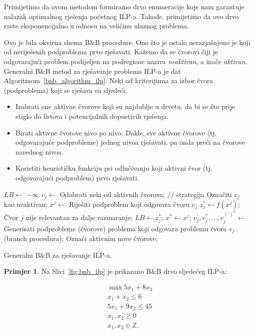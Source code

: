 \documentclass[a4paper, utf8, 11pt, colorlinks]{book}
\theoremstyle{definition}
\newtheorem{primjer}{Primjer}[chapter]
\begin{document}
Primijetimo da ovom metodom formiramo drvo enumeracije koje nam garantuje nalazak optimalnog rješenja početnog ILP-a. Takođe, primijetimo da ovo drvo raste eksponencijalno u odnosu na veličinu ulaznog problema.  

  Ovo je bila okvirna shema B\&B procedure. Ono što je ostalo nerazjašnjeno je koji od neriješenih podproblema prvo rješavati. Kažemo da se čvorovi čiji je odgovarajući problem podijeljen na podregione naziva \emph{neaktivan}, a inače \emph{aktivan}. Generalni B\&B metod za rješavanje problema ILP-a je dat   Algoritmom~\ref{bnb_algorithm_ilp}.  Neki od kriterijuma za izbor čvora (podproblema) koji se rješava su sljedeći:
  \begin{itemize}
  	\item Izabrati one aktivne čvorove koji su najdublje u drvetu, da bi se što prije stiglo do listova i potencijalnih dopustivih rješenja.
  	\item Birati aktivne čvorove nivo po nivo. Dakle, sve aktivne čvorove (tj. odgovarajuće podprobleme) jednog nivoa   rješavati, pa onda preći na čvorove narednog nivoa. 
  	\item Koristiti heurističku funkciju pri odlučivanju koji aktivni čvor (tj. odgovarajući podproblem) prvo rješavati. 
  \end{itemize}

\begin{algorithm}[!htb] 
	\begin{algorithmic}[1] 
		\STATE $LB \gets$ $-\infty$
		\STATE  $v_j \gets$ Odabrati neki od aktivnih čvorova; // strategija
		\STATE  Označiti $v_j$ kao neaktivan;
		\STATE  $x^j \gets$ Riješiti podproblem koji odgovara čvoru $v_j$
		\STATE $z^*_j \gets f(x^j)$;
		\STATE Čvor $j$ nije relevantan za dalje razmaranje; 
		\ENDIF
		\STATE $LB \gets z^*_j$;
		\STATE $x^* \gets x^j$;
		\ENDIF
		\ENDIF
		\STATE $v_j^{'}, v_j^{''},\ldots, v_j^{(')^k}  \gets$ Generisati podprobleme (čvorove) problema koji odgovara problemu čvora $v_j$ (branch procedura);
		\STATE Označi aktivnim nove čvorove; 
		\ENDIF
		\ENDIF
		\ENDWHILE
	\end{algorithmic}
	\caption{Generalni B\&B za rješavanje ILP-a.}\label{bnb_algorithm_ilp}
\end{algorithm}
\begin{primjer}
Na Slici~\ref{fig:bnb_ilp} je prikazano B\&B drvo sljedećeg ILP-a:
\end{primjer}
\begin{align*}
    &\max 5 x_1 + 8 x_2 \\
    &x_1 + x_2 \leq 6 \\
    & 5 x_1 + 9 x_2 \leq 45 \\
    & x_1, x_2 \geq 0\\
    & x_1,x_2 \in \mathbb{Z}.
\end{align*}
\end{document}
